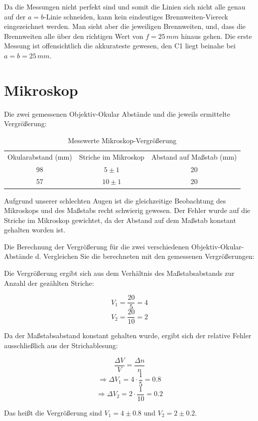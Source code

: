 \documentclass[
  headings=optiontotocandhead,
  twoside,
  openright,
  numbers=noenddot,
  toc=flat,
  11pt,
  parskip=full,
  listof=flat,
  bibliography=totoc,
  a4paper,
  DIV=14,
  BCOR=22mm,
  headheight=5mm,
  headinclude=true,
]{scrartcl}
\begin{document}
Da die Messungen nicht perfekt sind und somit die Linien sich nicht alle genau auf der $a=b$-Linie schneiden, kann kein eindeutiges Brennweiten-Viereck eingezeichnet werden. Man sieht aber die jeweiligen Brennweiten, und, dass die Brennweiten alle über den richtigen Wert von $f = 25 \, mm$ hinaus gehen. Die erste Messung ist offensichtlich die akkurateste gewesen, den C1 liegt beinahe bei $a = b = 25 \, mm$.

\section{Mikroskop}

Die zwei gemessenen Objektiv-Okular Abstände und die jeweils ermittelte Vergrößerung:

\begin{table}[H]
  \centering
  \setlength{\tabcolsep}{10pt}
  \begin{tabular}{ |c|c|c| }
    \multicolumn{1}{c}{Okularabstand (mm)} & \multicolumn{1}{c}{Striche im Mikroskop} & \multicolumn{1}{c}{Abstand auf Maßstab (mm)} \\
    98 & $5 \pm 1$ & 20 \\
    57 & $10 \pm 1$ & 20 \\
  \end{tabular}
  \caption{Messwerte Mikroskop-Vergrößerung}
  \label{tab:linsen}
\end{table}

Aufgrund unserer schlechten Augen ist die gleichzeitige Beobachtung des Mikroskops und des Maßstabs recht schwierig gewesen. Der Fehler wurde auf die Striche im Mikroskop gewichtet, da der Abstand auf dem Maßstab konstant gehalten worden ist.

Die Berechnung der Vergrößerung für die zwei verschiedenen Objektiv-Okular-Abstände d. Vergleichen Sie die berechneten mit den gemessenen Vergrößerungen:

Die Vergrößerung ergibt sich aus dem Verhältnis des Maßstabsabstands zur Anzahl der gezählten Striche:

$$
V_1 = \frac{20}{5} = 4
$$
$$
V_2 = \frac{20}{10} = 2
$$

Da der Maßstabsabstand konstant gehalten wurde, ergibt sich der relative Fehler ausschließlich aus der Strichablesung:

$$
\frac{\Delta V}{V} = \frac{\Delta n}{n}
$$
$$
\Rightarrow \Delta V_1 = 4 \cdot \frac{1}{5} = 0.8
$$
$$
\Rightarrow \Delta V_2 = 2 \cdot \frac{1}{10} = 0.2
$$

Das heißt die Vergrößerung sind $V_1 = 4 \pm 0.8$ und $V_2 = 2 \pm 0.2$.
\end{document}
